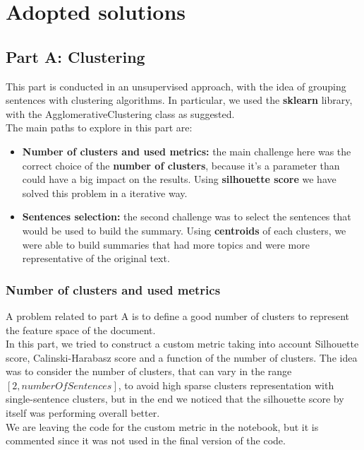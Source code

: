 \section{Adopted solutions}

\subsection*{Part A: Clustering}
This part is conducted in an unsupervised approach, with the idea of grouping
sentences with clustering algorithms. In particular, we used the
\textbf{sklearn} library, with the AgglomerativeClustering class as
suggested.\\ The main paths to explore in this part are:
\begin{itemize}
    \item \textbf{Number of clusters and used metrics: }  the main challenge here was the correct choice of the \textbf{number of clusters}, because it's a parameter than could have a big impact on the results. Using \textbf{silhouette score } we have solved this problem in a iterative way.
    \item \textbf{Sentences selection: } the second challenge was to select the sentences that would be used to build the summary. Using \textbf{centroids} of each clusters, we were able to build summaries that had more topics and were more representative of the original text.
\end{itemize}

\subsubsection*{Number of clusters and used metrics} 
A problem related to part A is to define a good number of clusters to represent the feature space of the document.\\
In this part, we tried to construct a custom metric taking into account Silhouette score, Calinski-Harabasz score and a function of the number of clusters. The idea was to consider the number of clusters, that can vary in the range $[2,numberOfSentences]$, to avoid high sparse clusters representation with single-sentence clusters, but in the end we noticed that the silhouette score by itself was performing overall better.\\We are leaving the code for the custom metric in the notebook, but it is commented since it was not used in the final version of the code.\\

